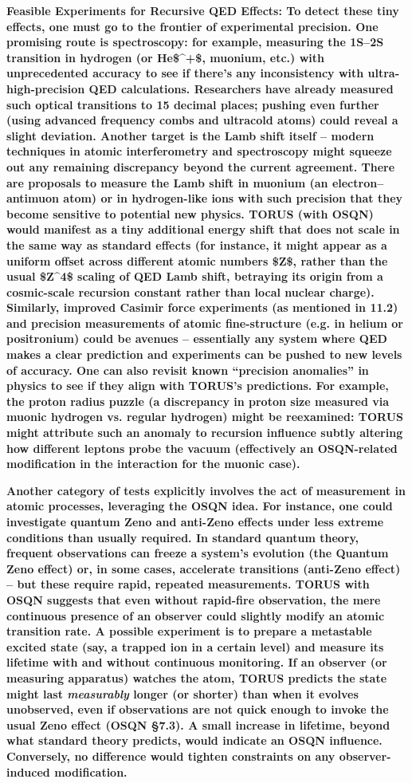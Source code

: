 \documentclass[
]{article}
\begin{document}
\textbf{Feasible Experiments for Recursive QED Effects: To detect these
tiny effects, one must go to the frontier of experimental precision. One
promising route is spectroscopy: for example, measuring the 1S--2S
transition in hydrogen (or He\$\^{}+\$, muonium, etc.) with
unprecedented accuracy to see if there's any inconsistency with
ultra-high-precision QED calculations. Researchers have already measured
such optical transitions to 15 decimal places; pushing even further
(using advanced frequency combs and ultracold atoms) could reveal a
slight deviation. Another target is the Lamb shift itself -- modern
techniques in atomic interferometry and spectroscopy might squeeze out
any remaining discrepancy beyond the current agreement. There are
proposals to measure the Lamb shift in muonium (an electron--antimuon
atom) or in hydrogen-like ions with such precision that they become
sensitive to potential new physics. TORUS (with OSQN) would manifest as
a tiny additional energy shift that does not scale in the same way as
standard effects (for instance, it might appear as a uniform offset
across different atomic numbers \$Z\$, rather than the usual \$Z\^{}4\$
scaling of QED Lamb shift, betraying its origin from a cosmic-scale
recursion constant rather than local nuclear charge). Similarly,
improved Casimir force experiments (as mentioned in 11.2) and precision
measurements of atomic fine-structure (e.g. in helium or positronium)
could be avenues -- essentially any system where QED makes a clear
prediction and experiments can be pushed to new levels of accuracy. One
can also revisit known ``precision anomalies'' in physics to see if they
align with TORUS's predictions. For example, the proton radius puzzle (a
discrepancy in proton size measured via muonic hydrogen vs. regular
hydrogen) might be reexamined: TORUS might attribute such an anomaly to
recursion influence subtly altering how different leptons probe the
vacuum (effectively an OSQN-related modification in the interaction for
the muonic case).}

\textbf{Another category of tests explicitly involves the act of
measurement in atomic processes, leveraging the OSQN idea. For instance,
one could investigate quantum Zeno and anti-Zeno effects under less
extreme conditions than usually required. In standard quantum theory,
frequent observations can freeze a system's evolution (the Quantum Zeno
effect) or, in some cases, accelerate transitions (anti-Zeno effect) --
but these require rapid, repeated measurements. TORUS with OSQN suggests
that even without rapid-fire observation, the mere continuous presence
of an observer could slightly modify an atomic transition rate. A
possible experiment is to prepare a metastable excited state (say, a
trapped ion in a certain level) and measure its lifetime with and
without continuous monitoring. If an observer (or measuring apparatus)
watches the atom, TORUS predicts the state might last \emph{measurably}
longer (or shorter) than when it evolves unobserved, even if
observations are not quick enough to invoke the usual Zeno effect (OSQN
§7.3). A small increase in lifetime, beyond what standard theory
predicts, would indicate an OSQN influence. Conversely, no difference
would tighten constraints on any observer-induced modification.}
\end{document}
